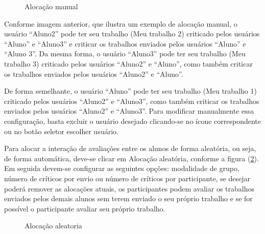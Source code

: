 \begin{figure}[htbp]
 \begin{center}
  \caption{Alocação manual}
  \label{fig:aloc_manual}
 \end{center}
\end{figure}

Conforme imagem anterior, que ilustra um exemplo de alocação manual, o usuário “Aluno2” pode ter seu trabalho (Meu trabalho 2) criticado pelos usuários “Aluno” e “Aluno3” e criticar os trabalhos enviados pelos usuários “Aluno” e “Aluno 3”.  Da mesma forma, o usuário “Aluno3” pode ter seu trabalho (Meu trabalho 3) criticado pelos usuários “Aluno2” e “Aluno”, como também criticar os trabalhos enviados pelos usuários “Aluno2” e “Aluno”.

De forma semelhante, o usuário “Aluno” pode ter seu trabalho (Meu trabalho 1) criticado pelos usuários “Aluno2” e “Aluno3”, como também criticar os trabalhos enviados pelos usuários “Aluno2” e “Aluno3”. Para modificar manualmente essa configuração, basta excluir o usuário desejado clicando-se no ícone  correspondente ou no botão seletor escolher usuário.

Para alocar a interação de avaliações entre os alunos de forma aleatória, ou seja, de forma automática, deve-se clicar em
Alocação aleatória, conforme a figura (\ref{fig:aloc_aletoria}). Em seguida devem-se configurar as seguintes opções: modalidade de grupo, número de críticos por envio ou número de críticos por participante, se desejar poderá remover as alocações atuais, os participantes podem avaliar os trabalhos enviados pelos demais alunos sem terem enviado o seu próprio trabalho e se for possível o participante avaliar seu próprio trabalho.

\begin{figure}[htbp]
 \begin{center}
  \caption{Alocação aleatoria}
  \label{fig:aloc_aletoria}
 \end{center}
\end{figure}

